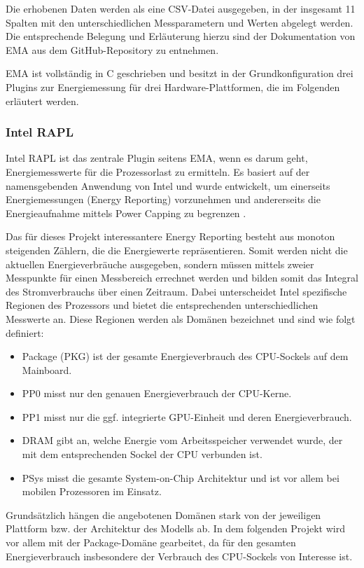 \documentclass[paper=a4, fontsize=11pt]{scrartcl} %
\numberwithin{equation}{section} %
\numberwithin{figure}{section} %
\numberwithin{table}{section} %
\begin{document}
Die erhobenen Daten werden als eine CSV-Datei ausgegeben, in der insgesamt 11 Spalten mit den unterschiedlichen Messparametern und Werten abgelegt werden. Die entsprechende Belegung und Erläuterung hierzu sind der Dokumentation von EMA aus dem GitHub-Repository zu entnehmen.

EMA ist vollständig in C geschrieben und besitzt in der Grundkonfiguration drei Plugins zur Energiemessung für drei Hardware-Plattformen, die im Folgenden erläutert werden.
\subsubsection{Intel RAPL}
Intel RAPL ist das zentrale Plugin seitens EMA, wenn es darum geht, Energiemesswerte für die Prozessorlast zu ermitteln. Es basiert auf der namensgebenden Anwendung von Intel und wurde entwickelt, um einerseits Energiemessungen (Energy Reporting) vorzunehmen und andererseits die Energieaufnahme mittels Power Capping zu begrenzen \cite{menra2027rapl}.

Das für dieses Projekt interessantere Energy Reporting besteht aus monoton steigenden Zählern, die die Energiewerte repräsentieren. Somit werden nicht die aktuellen Energieverbräuche ausgegeben, sondern müssen mittels zweier Messpunkte für einen Messbereich errechnet werden und bilden somit das Integral des Stromverbrauchs über einen Zeitraum. Dabei unterscheidet Intel spezifische Regionen des Prozessors und bietet die entsprechenden unterschiedlichen Messwerte an. Diese Regionen werden als Domänen bezeichnet und sind wie folgt definiert:
\begin{itemize}
    \item Package (PKG) ist der gesamte Energieverbrauch des CPU-Sockels auf dem Mainboard.
    \item PP0 misst nur den genauen Energieverbrauch der CPU-Kerne.
    \item PP1 misst nur die ggf. integrierte GPU-Einheit und deren Energieverbrauch.
    \item DRAM gibt an, welche Energie vom Arbeitsspeicher verwendet wurde, der mit dem entsprechenden Sockel der CPU verbunden ist.
    \item PSys misst die gesamte System-on-Chip Architektur und ist vor allem bei mobilen Prozessoren im Einsatz.
\end{itemize}
Grundsätzlich hängen die angebotenen Domänen stark von der jeweiligen Plattform bzw. der Architektur des Modells ab. In dem folgenden Projekt wird vor allem mit der Package-Domäne gearbeitet, da für den gesamten Energieverbrauch insbesondere der Verbrauch des CPU-Sockels von Interesse ist.
\end{document}
